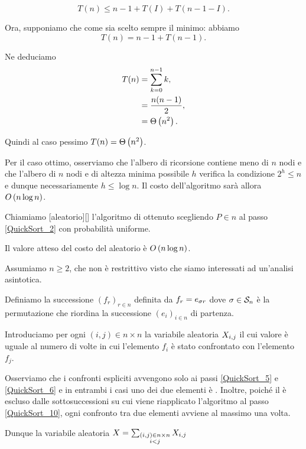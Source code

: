 \[
	T(n) \leq n - 1 + T(I) + T(n - 1 - I).
\]
\par Ora, supponiamo che come  sia scelto sempre il minimo:
abbiamo
\[
	T(n) = n - 1 + T(n - 1).
\]
\par Ne deduciamo
\begin{align*}
  T(n)
  &= \sum_{k = 0}^{n - 1} k,\\
  &= \frac{n(n - 1)}{2},\\
  &= \Theta \left ( n^2 \right ).
\end{align*}
\par Quindi al caso pessimo $T(n) = \Theta \left ( n^2 \right )$.
\par Per il caso ottimo, osserviamo che l'albero di ricorsione contiene meno di
$n$ nodi e che l'albero di $n$ nodi e di altezza minima possibile $h$
verifica la condizione $2^h \leq n$ e dunque necessariamente $h \leq \log n$.
Il costo dell'algoritmo sar\`a allora $O \left ( n \log n \right )$. \EndProof
\begin{Definition}
  Chiamiamo
  [aleatorio][]
  l'algoritmo di  ottenuto scegliendo $P \in n$
  al passo \ref{QuickSort_2} con probabilit\`a uniforme.
\end{Definition}
\begin{Theorem}
  Il valore atteso del costo del  aleatorio \`e
  $O \left ( n \log n \right )$.
\end{Theorem}
\Proof Assumiamo $n \geq 2$, che non \`e restrittivo visto che siamo interessati
ad un'analisi asintotica.
\par Definiamo la successione $(f_r)_{r \in n}$ definita da
$f_r = e_{\Permutation{r}}$
dove
$\Permutation \in \SymmetricGroup{n}$
\`e la permutazione che riordina la successione $(e_i)_{i \in n}$ di partenza.
\par Introduciamo per ogni $(i,j) \in n \times n$ la variabile aleatoria
$X_{i,j}$ il cui valore \`e uguale al numero di volte in cui
l'elemento $f_i$ \`e stato confrontato con l'elemento $f_j$.
\par Osserviamo che i confronti espliciti avvengono solo ai passi
\ref{QuickSort_5}
e
\ref{QuickSort_6}
e in entrambi i casi uno dei due elementi \`e .
Inoltre, poich\'e il  \`e escluso dalle sottosuccessioni
su cui viene riapplicato l'algoritmo al passo
\ref{QuickSort_10}, ogni confronto tra due elementi avviene al massimo
una volta.
\par Dunque la variabile aleatoria
$X
= \sum_{\substack{(i,j) \in n \times n\\i < j}} X_{i,j}$
